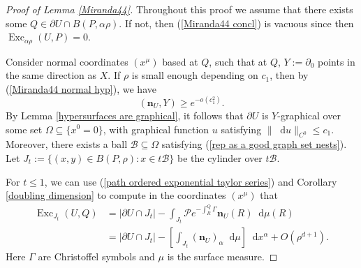 \documentclass[reqno,11pt]{amsart}
\DeclareMathOperator{\Exc}{Exc}
\newcommand*\dif{\mathop{}\!\mathrm{d}}
\newcommand{\normal}{\mathbf n}
\theoremstyle{definition}
\numberwithin{equation}{section}
\begin{document}
\begin{proof}[Proof of Lemma \ref{Miranda44}]
Throughout this proof we assume that there exists some $Q \in \partial U \cap B(P, \alpha \rho)$.
If not, then (\ref{Miranda44 concl}) is vacuous since then $\Exc_{\alpha \rho} (U, P) = 0$.

Consider normal coordinates $(x^\mu)$ based at $Q$, such that at $Q$, $Y := \partial_0$ points in the same direction as $X$.
If $\rho$ is small enough depending on $c_1$, then by (\ref{Miranda44 normal hyp}), we have 
$$(\normal_U, Y) \geq e^{-o(c_1^2)}.$$
By Lemma \ref{hypersurfaces are graphical}, it follows that $\partial U$ is $Y$-graphical over some set $\Omega \subseteq \{x^0 = 0\}$, with graphical function $u$ satisfying $\|\dif u\|_{C^0} \leq c_1$.
Moreover, there exists a ball $\mathscr B \subseteq \Omega$ satisfying (\ref{rep as a good graph set nests}).
Let $J_t := \{(x, y) \in B(P, \rho): x \in t\mathscr B\}$ be the cylinder over $t\mathscr B$.

For $t \leq 1$, we can use (\ref{path ordered exponential taylor series}) and Corollary \ref{doubling dimension} to compute in the coordinates $(x^\mu)$ that
\begin{align*}
    \Exc_{J_t}(U, Q) &= |\partial U \cap J_t| - \int_{J_t} \mathcal Pe^{-\int_R^Q \Gamma} \normal_U(R) \dif \mu(R) \\
    &= |\partial U \cap J_t| - \left[\int_{J_t} (\normal_U)_\alpha \dif \mu\right] \dif x^\alpha + O(\rho^{d + 1}).
\end{align*}
Here $\Gamma$ are Christoffel symbols and $\mu$ is the surface measure.


\end{proof}
\end{document}
